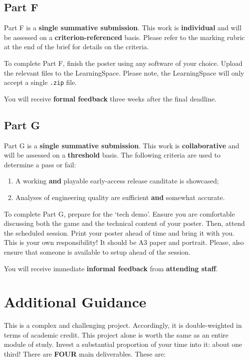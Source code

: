 \documentclass{../../fal_assignment}
\begin{document}
\subsection*{Part F}

Part F is a \textbf{single summative submission}. This work is \textbf{individual} and will be assessed on a \textbf{criterion-referenced} basis. Please refer to the marking rubric at the end of the brief for details on the criteria.

To complete Part F, finish the poster using any software of your choice. Upload the relevant files to the LearningSpace. Please note, the LearningSpace will only accept a single \texttt{.zip} file.

You will receive \textbf{formal feedback} three weeks after the final deadline.

\subsection*{Part G}

Part G is a \textbf{single summative submission}. This work is \textbf{collaborative} and will be assessed on a \textbf{threshold} basis. The following criteria are used to determine a pass or fail:

\begin{enumerate}[label=(\alph*)]
	\item A working \textbf{and} playable early-access release canditate is showcased;
	\item Analyses of engineering quality are sufficient \textbf{and} somewhat accurate.
\end{enumerate}

To complete Part G, prepare for the `tech demo'. Ensure you are comfortable discussing both the game and the technical content of your poster. Then, attend the scheduled session. Print your poster ahead of time and bring it with you. This is your own responsibility! It should be A3 paper and portrait. Please, also ensure that someone is available to setup ahead of the session.

You will receive immediate \textbf{informal feedback} from \textbf{attending staff}.

\section*{Additional Guidance}

This is a complex and challenging project. Accordingly, it is double-weighted in terms of academic credit. This project alone is worth the same as an entire module of study. Invest a substantial proportion of your time into it: about one third! There are \textbf{FOUR} main deliverables. These are:
\end{document}
